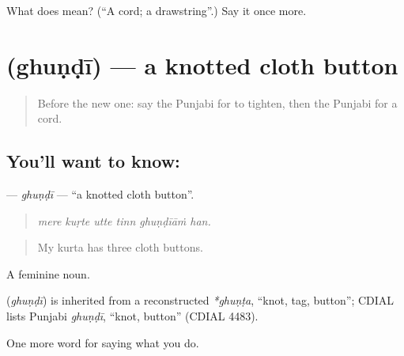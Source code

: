\begin{tcolorbox}[breakable,colback=teal!4,colframe=teal!35!black,title={Before you move on}]
What does  mean? (\textquotedblleft{}A cord; a drawstring\textquotedblright{}.) Say it once more.
\end{tcolorbox}
\section[\texorpdfstring{\pa{ਘੁੰਡੀ} (ghuṇḍī)}{ਘੁੰਡੀ (ghuṇḍī)}]{ (ghuṇḍī) — a knotted cloth button}

\label{lesson:PA-C229-ghundi}



\begin{quote}
Before the new one: say the Punjabi for to tighten, then the Punjabi for a cord.
\end{quote}

\subsection*{You'll want to know: }
\textbf{} — \emph{ghuṇḍī} — \textquotedblleft{}a knotted cloth button\textquotedblright{}.

\begin{quote}
     
\end{quote}

\begin{quote}
\emph{mere kuṛte utte tinn ghuṇḍīāṁ han.}
\end{quote}

\begin{quote}
My kurta has three cloth buttons.
\end{quote}

A feminine noun.

\begin{cousinweb}
\textbf{} (\emph{ghuṇḍī}) is inherited from a reconstructed \emph{*ghuṇṭa}, \textquotedblleft{}knot, tag, button\textquotedblright{}; CDIAL lists Punjabi \emph{ghuṇḍī}, \textquotedblleft{}knot, button\textquotedblright{} (CDIAL 4483).
\end{cousinweb}

\begin{grammarlens}[title={What you've built}]
One more word for saying what you do.
\end{grammarlens}

